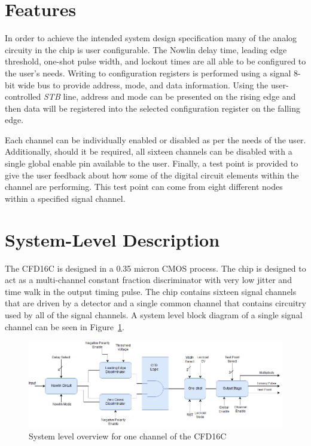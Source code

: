 \documentclass[12pt,oneside,final]{siuethesis}
\theoremstyle{definition}
\begin{document}
\section{Features}
\par In order to achieve the intended system design specification many of the analog circuity in the chip is user configurable. The  Nowlin delay time, leading edge threshold, one-shot pulse width, and lockout times are all able to be configured to the user's needs. Writing to configuration registers is performed using a signal 8-bit wide bus to provide address, mode, and data information. 
Using the user-controlled \emph{STB} line, address and mode can be presented on the rising edge and then data will be registered into the selected configuration register on the falling edge. 
\par Each channel can be individually enabled or disabled as per the needs of the user. Additionally, should it be required, all sixteen channels can be disabled with a single global enable pin available to the user. Finally, a test point is provided to give the user feedback about how some of the digital circuit elements within the channel are performing. This test point can come from eight different nodes within a specified signal channel.

\section{System-Level Description}
\par The CFD16C is designed in a 0.35 micron CMOS process. The chip is designed to act as a multi-channel constant fraction discriminator with very low jitter and time walk in the output timing pulse. The chip contains sixteen signal channels that are driven by a detector and a single common channel that contains circuitry used by all of the signal channels. A system level block diagram of a single signal channel can be seen in Figure~\ref{fig:CFD}.

\begin{figure}[ht]
\centering
\includegraphics[scale=.47,keepaspectratio=true]{./ch2_figures/channel_block.png} 
\caption{System level overview for one channel of the CFD16C}
\label{fig:CFD}
\end{figure}
\end{document}
